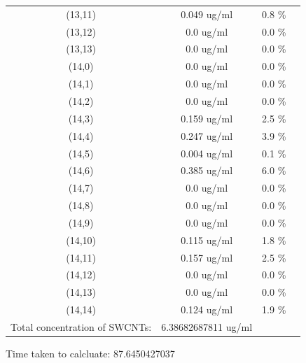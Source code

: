 \documentclass{article}
\begin{document}
\begin{tabular}{c c c c}
(13,11)&        0.049 ug/ml        &0.8 \%\\
(13,12)&        0.0 ug/ml        &0.0 \%\\
(13,13)&        0.0 ug/ml        &0.0 \%\\
(14,0)&        0.0 ug/ml        &0.0 \%\\
(14,1)&        0.0 ug/ml        &0.0 \%\\
(14,2)&        0.0 ug/ml        &0.0 \%\\
(14,3)&        0.159 ug/ml        &2.5 \%\\
(14,4)&        0.247 ug/ml        &3.9 \%\\
(14,5)&        0.004 ug/ml        &0.1 \%\\
(14,6)&        0.385 ug/ml        &6.0 \%\\
(14,7)&        0.0 ug/ml        &0.0 \%\\
(14,8)&        0.0 ug/ml        &0.0 \%\\
(14,9)&        0.0 ug/ml        &0.0 \%\\
(14,10)&        0.115 ug/ml        &1.8 \%\\
(14,11)&        0.157 ug/ml        &2.5 \%\\
(14,12)&        0.0 ug/ml        &0.0 \%\\
(14,13)&        0.0 ug/ml        &0.0 \%\\
(14,14)&        0.124 ug/ml        &1.9 \%\\
Total concentration of SWCNTs: &6.38682687811 ug/ml\\

\end{tabular}Time taken to calcluate: 87.6450427037
\end{document}
